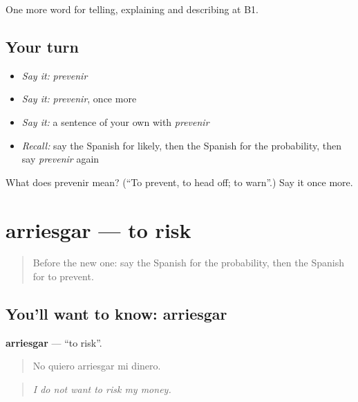 \begin{grammarlens}[title={What you've built}]
One more word for telling, explaining and describing at B1.
\end{grammarlens}

\subsection*{Your turn}
\begin{itemize}
\raggedright
  \item \emph{Say it:} \emph{prevenir}
  \item \emph{Say it:} \emph{prevenir}, once more
  \item \emph{Say it:} a sentence of your own with \emph{prevenir}
  \item \emph{Recall:} say the Spanish for likely, then the Spanish for the probability, then say \emph{prevenir} again
\end{itemize}

\begin{tcolorbox}[breakable,colback=teal!4,colframe=teal!35!black,title={Before you move on}]
What does prevenir mean? (\textquotedblleft{}To prevent, to head off; to warn\textquotedblright{}.) Say it once more.
\end{tcolorbox}
\section[arriesgar]{arriesgar — to risk}

\label{lesson:ES-C614-arriesgar}



\begin{quote}
Before the new one: say the Spanish for the probability, then the Spanish for to prevent.
\end{quote}

\subsection*{You'll want to know: arriesgar}
\textbf{arriesgar} — \textquotedblleft{}to risk\textquotedblright{}.

\begin{quote}
No quiero arriesgar mi dinero.
\end{quote}

\begin{quote}
\emph{I do not want to risk my money.}
\end{quote}

